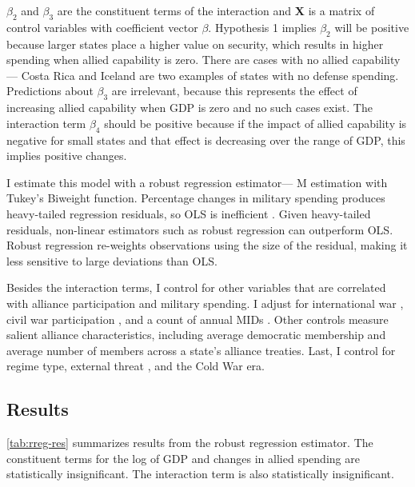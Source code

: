 \documentclass[12pt]{article}
\begin{document}
$\beta_2$ and $\beta_3$ are the constituent terms of the interaction and \textbf{X} is a matrix of control variables with coefficient vector $\beta$.
Hypothesis 1 implies $\beta_2$ will be positive because larger states place a higher value on security, which results in higher spending when allied capability is zero.
There are cases with no allied capability--- Costa Rica and Iceland are two examples of states with no defense spending.  
Predictions about $\beta_3$ are irrelevant, because this represents the effect of increasing allied capability when GDP is zero and no such cases exist. 
The interaction term $\beta_4$ should be positive because if the impact of allied capability is negative for small states and that effect is decreasing over the range of GDP, this implies positive changes. 


I estimate this model with a robust regression estimator--- M estimation with Tukey's Biweight function. 
Percentage changes in military spending produces heavy-tailed regression residuals, so OLS is inefficient \citep{RaineyBaissa2018}. 
Given heavy-tailed residuals, non-linear estimators such as robust regression can outperform OLS. 
Robust regression re-weights observations using the size of the residual, making it less sensitive to large deviations than OLS. 


Besides the interaction terms, I control for other variables that are correlated with alliance participation and military spending. 
I adjust for international war \citep{Reiteretal2016}, civil war participation \citep{SarkeesWayman2010}, and a count of annual MIDs \citep{Gibleretal2016}. 
Other controls measure salient alliance characteristics, including average democratic membership \citep{DigiuseppePoast2016} and average number of members across a state's alliance treaties.   
Last, I control for regime type, external threat \citep{LeedsSavun2007}, and the Cold War era. 


\subsection{Results}

 
\autoref{tab:rreg-res} summarizes results from the robust regression estimator. 
The constituent terms for the log of GDP and changes in allied spending are statistically insignificant. 
The interaction term is also statistically insignificant. 
\end{document}
